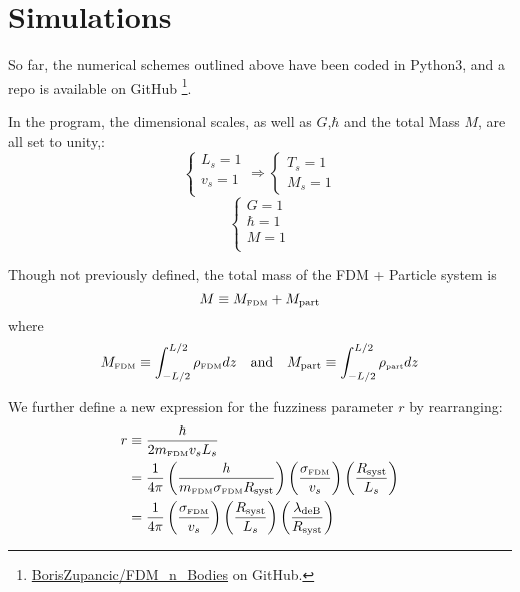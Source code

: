 \documentclass{book}
\begin{document}
\chapter{Simulations}
So far, the numerical schemes outlined above have been coded in Python3, and a repo is available on GitHub \footnote{\hyperlink{https://github.com/BorisZupancic/FDM_n_Bodies}{BorisZupancic/FDM\_n\_Bodies} on GitHub.}.

In the program, the dimensional scales, as well as $G$,$\hbar$ and the total Mass $M$, are all set to unity,:
\begin{equation*}
    \begin{cases} L_s = 1\\ v_s = 1\\ \end{cases}\Rightarrow \begin{cases}T_s = 1\\ M_s = 1\end{cases} 
\end{equation*}
\begin{equation*}
    \begin{cases}
        G = 1\\
        \hbar = 1\\
        M = 1\\
    \end{cases}
\end{equation*}
    
Though not previously defined, the total mass of the FDM + Particle system is 
\begin{equation}
    M \equiv M_\text{\tiny{FDM}} + M_\text{part} \\
\end{equation}
where
\begin{align}
    M_\text{\tiny{FDM}} \equiv \int_{-L/2}^{L/2} \rho_\text{\tiny{FDM}} dz & &\text{and}& &
    M_\text{part} \equiv \int_{-L/2}^{L/2} \rho_\text{\tiny{part}} dz
\end{align}

We further define a new expression for the fuzziness parameter $r$ by rearranging:
\begin{align}
    r & \equiv \frac{\hbar}{2m_\text{\tiny{FDM}} v_s L_s}  \\
    & = \frac{1}{4\pi} \left(\frac{h}{m_\text{\tiny{FDM}} \sigma_\text{\tiny{FDM}} R_\text{syst}}\right) \left(\frac{\sigma_\text{\tiny{FDM}}}{v_s}\right) \left(\frac{R_\text{syst}}{L_s}\right) \\
    & = \frac{1}{4\pi} \left(\frac{\sigma_\text{\tiny{FDM}}}{v_s}\right) \left(\frac{R_\text{syst}}{L_s}\right)
    \left(\frac{\lambda_\text{deB}}{R_\text{syst}}\right)
\end{align}
\end{document}
